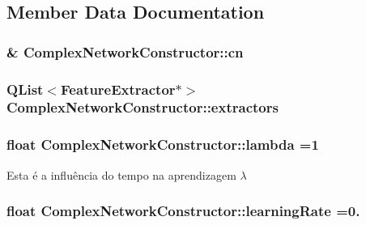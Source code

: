 \subsection{Member Data Documentation}
\hypertarget{class_complex_network_constructor_afcee75ad05cd5cf6e4510096987a105b}{
\subsubsection[{cn}]{\& Complex\+Network\+Constructor\+::cn\hspace{0.3cm}{\ttfamily [private]}}}\label{class_complex_network_constructor_afcee75ad05cd5cf6e4510096987a105b}
\hypertarget{class_complex_network_constructor_a75c5f820c19bae3cb46671aa89ef348f}{
\subsubsection[{extractors}]{\setlength{\rightskip}{0pt plus 5cm}Q\+List$<${\bf Feature\+Extractor}$\ast$$>$ Complex\+Network\+Constructor\+::extractors\hspace{0.3cm}{\ttfamily [private]}}}\label{class_complex_network_constructor_a75c5f820c19bae3cb46671aa89ef348f}
\hypertarget{class_complex_network_constructor_a9d3e346719dc1f8f3093a48b8d44e669}{
\subsubsection[{lambda}]{\setlength{\rightskip}{0pt plus 5cm}float Complex\+Network\+Constructor\+::lambda =1\hspace{0.3cm}{\ttfamily [private]}}}\label{class_complex_network_constructor_a9d3e346719dc1f8f3093a48b8d44e669}
Esta é a influência do tempo na aprendizagem $ \lambda $ \hypertarget{class_complex_network_constructor_aa7fe374b9733338b8176708f77d29c55}{
\subsubsection[{learning\+Rate}]{\setlength{\rightskip}{0pt plus 5cm}float Complex\+Network\+Constructor\+::learning\+Rate =0.\hspace{0.3cm}{\ttfamily [private]}}}\label{class_complex_network_constructor_aa7fe374b9733338b8176708f77d29c55}
